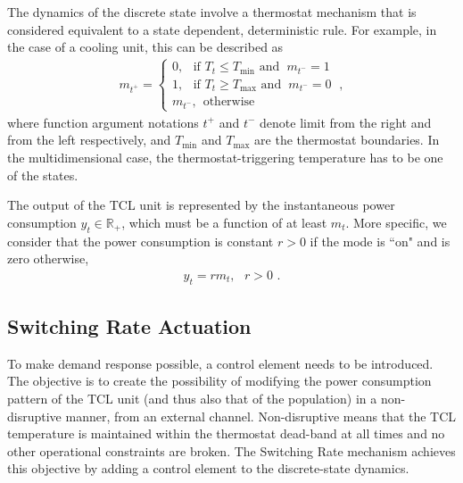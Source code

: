 \documentclass[submission,copyright,creativecommons]{eptcs}
\begin{document}
The dynamics of the discrete state involve a thermostat mechanism that is considered equivalent to a state dependent, deterministic rule. For example, in the case of a cooling unit, this can be described as
\begin{align}
  m_{t^+} = \begin{cases} 
                       0, \hspace{5pt} \text{ if } T_{t} \leq T_{\mathrm{min}}  \text{ and } \hspace{3pt} m_{t^-} = 1 \\
                       1, \hspace{5pt} \text{ if } T_{t} \geq T_{\mathrm{max}} \text{ and } \hspace{3pt} m_{t^-} = 0 \\
                      m_{t^-}, \hspace{5pt} \text{otherwise}
                 \end{cases} ~, \label{eq:discrete_dyn}  
\end{align}
where function argument notations $t^+$ and $t^-$ denote limit from the right and from the left respectively, and $T_{\min}$ and $T_{\max}$ are the thermostat boundaries. In the multidimensional case, the thermostat-triggering temperature has to be one of the states.


The output of the TCL unit is represented by the instantaneous power consumption $y_t \in \mathbb{R}_{+}$, which must be a function of at least $m_t$. More specific, we consider that the power consumption is constant $r>0$ if the mode is ``on" and is zero otherwise, 
\begin{align}
    y_t = r m_t, \text{  } r>0 \text{  .} \label{eq:output_eq}
\end{align}

\subsection{Switching Rate Actuation}
To make demand response possible, a control element needs to be introduced. The objective is to create the possibility of modifying the power consumption pattern of the TCL unit (and thus also that of the population) in a non-disruptive manner, from an external channel. Non-disruptive means that the TCL temperature is maintained within the thermostat dead-band at all times and no other operational constraints are broken. The Switching Rate mechanism achieves this objective by adding a control element to the discrete-state dynamics.
\end{document}

